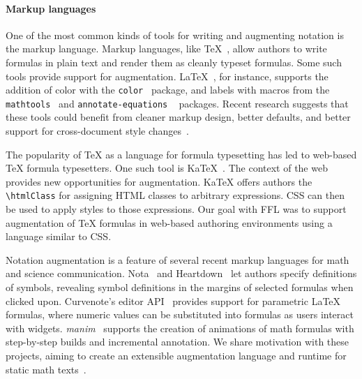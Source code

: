 
\paragraph{Markup languages}

One of the most common kinds of tools for writing and augmenting notation is the markup language. Markup languages, like TeX~\cite{ref:knuth1986tex}, allow authors to write formulas in plain text and render them as cleanly typeset formulas. Some such tools provide support for augmentation. LaTeX~\cite{tool:latex}, for instance, supports the addition of color with the \texttt{color}~\cite{tool:carlisle1997color} package, and labels with macros from the \texttt{mathtools}~\cite{tool:madsen2014mathtools} and \texttt{annotate-equations} ~\cite{tool:annotateequations} packages. Recent research suggests that these tools could benefit from cleaner markup design, better defaults, and better support for cross-document style changes~\cite{ref:head2022math}.

The popularity of TeX as a language for formula typesetting has led to web-based TeX formula typesetters. One such tool is KaTeX~\cite{tool:katex}. The context of the web provides new opportunities for augmentation. KaTeX offers authors the \texttt{\textbackslash{}htmlClass} for assigning HTML classes to arbitrary expressions. CSS can then be used to apply styles to those expressions. Our goal with FFL was to support augmentation of TeX formulas in web-based authoring environments using a language similar to CSS.

Notation augmentation is a feature of several recent markup languages for math and science communication. Nota~\cite{ref:crichton2021new} and Heartdown~\cite{ref:li2022heartdown} let authors specify definitions of symbols, revealing symbol definitions in the margins of selected formulas when clicked upon. Curvenote's editor API~\cite{tool:curvenote} provides support for parametric LaTeX formulas, where numeric values can be substituted into formulas as users interact with widgets. \emph{manim}~\cite{tool:manim} supports the creation of animations of math formulas with step-by-step builds and incremental annotation. We share motivation with these projects, aiming to create an extensible augmentation language and runtime for static math texts~\cite{ref:head2022math}.

